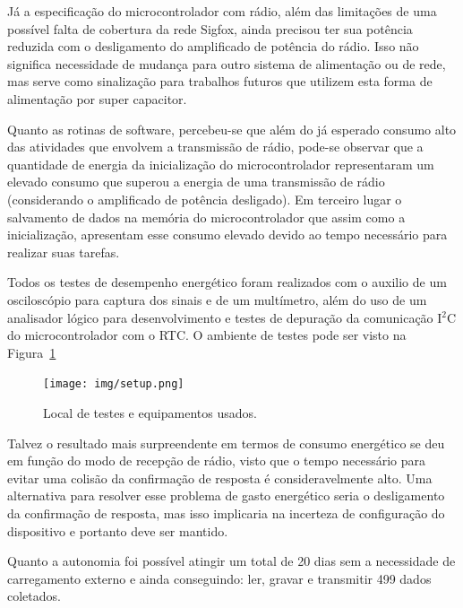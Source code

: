 Já a especificação do microcontrolador com rádio, além das limitações de uma possível falta de cobertura da rede Sigfox, ainda precisou ter sua potência reduzida com o desligamento do amplificado de potência do rádio. Isso não significa necessidade de mudança para outro sistema de alimentação ou de rede, mas serve como sinalização para trabalhos futuros que utilizem esta forma de alimentação por super capacitor.

Quanto as rotinas de software, percebeu-se que além do já esperado consumo alto das atividades que envolvem a transmissão de rádio, pode-se observar que a quantidade de energia da inicialização do microcontrolador representaram um elevado consumo que superou a energia de uma transmissão de rádio (considerando o amplificado de potência desligado). Em terceiro lugar o salvamento de dados na memória do microcontrolador que assim como a inicialização, apresentam esse consumo elevado devido ao tempo necessário para realizar suas tarefas.

Todos os testes de desempenho energético foram realizados com o auxilio de um osciloscópio para captura dos sinais e de um multímetro, além do uso de um analisador lógico para desenvolvimento e testes de depuração da comunicação I$^2$C do microcontrolador com o RTC. O ambiente de testes pode ser visto na Figura~\ref{fig:setup}

\begin{figure}[h!]
  \caption{Local de testes e equipamentos usados.}
  \begin{center}
      \texttt{[image: img/setup.png]}
  \end{center}
  \label{fig:setup}
\end{figure}

Talvez o resultado mais surpreendente em termos de consumo energético se deu em função do modo de recepção de rádio, visto que o tempo necessário para evitar uma colisão da confirmação de resposta é consideravelmente alto. Uma alternativa para resolver esse problema de gasto energético seria o desligamento da confirmação de resposta, mas isso implicaria na incerteza de configuração do dispositivo e portanto deve ser mantido.

Quanto a autonomia foi possível atingir um total de 20 dias sem a necessidade de carregamento externo e ainda conseguindo: ler, gravar e transmitir 499 dados coletados.